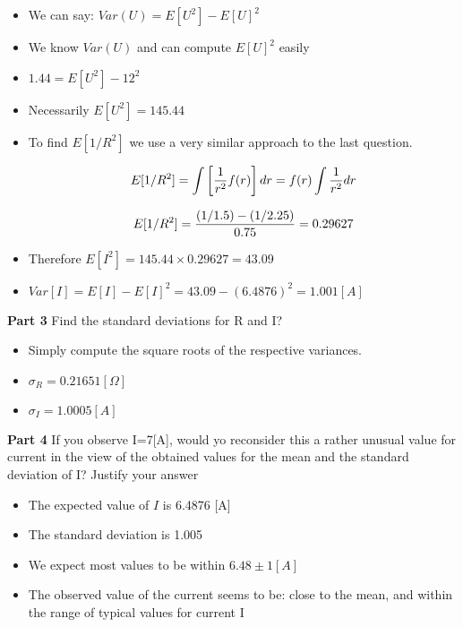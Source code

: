 \begin{itemize}

\item We can say: $Var(U) = E[U^2] - E[U]^2$
\item We know $Var(U)$ and can compute $E[U]^2$ easily
\item $1.44 = E[U^2] - 12^2$
\item Necessarily $ E[U^2] = 145.44$

\item To find $E[1/R^2]$ we use a very similar approach to the last question.

\[ E[1/R^2] =  \int \left[{1 \over r^2} f(r)\right] dr  = f(r) \int {1 \over r^2}  dr  \]

\[ E[1/R^2] = {(1/1.5) - (1/2.25) \over 0.75} = 0.29627 \]

\item Therefore $E[I^2]  = 145.44 \times 0.29627 = 43.09$

\item $Var[I] = E[I] - E[I]^2  = 43.09 - (6.4876)^2 = 1.001[A]$

\end{itemize}



\noindent\textbf{Part 3} Find the standard deviations for R and I?\\



\begin{itemize}
\item Simply compute the square roots of the respective variances.
\item $\sigma_R = 0.21651 [\Omega]$
\item $\sigma_I = 1.0005 [A]$
\end{itemize}



\noindent\textbf{Part 4} If you observe I=7[A], would yo reconsider this a rather unusual value for current in the view of the obtained values for the mean and the standard deviation of I? Justify your answer\\


\begin{itemize}
\item The expected value of $I$ is 6.4876 [A]
\item The standard deviation is 1.005
\item We expect most values to be within $6.48 \pm 1 [A]$

\item The observed value of the current seems to be: close to the mean, and within the range of typical values for current I
\end{itemize}

